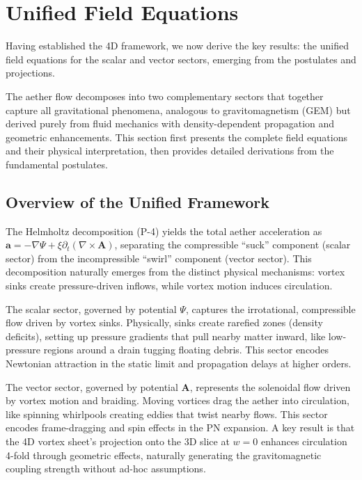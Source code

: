\section{Unified Field Equations}

Having established the 4D framework, we now derive the key results: the unified field equations for the scalar and vector sectors, emerging from the postulates and projections.

The aether flow decomposes into two complementary sectors that together capture all gravitational phenomena, analogous to gravitomagnetism (GEM) but derived purely from fluid mechanics with density-dependent propagation and geometric enhancements. This section first presents the complete field equations and their physical interpretation, then provides detailed derivations from the fundamental postulates.

\subsection{Overview of the Unified Framework}

The Helmholtz decomposition (P-4) yields the total aether acceleration as $\mathbf{a} = -\nabla \Psi + \xi \partial_t (\nabla \times \mathbf{A})$, separating the compressible ``suck'' component (scalar sector) from the incompressible ``swirl'' component (vector sector). This decomposition naturally emerges from the distinct physical mechanisms: vortex sinks create pressure-driven inflows, while vortex motion induces circulation.

The scalar sector, governed by potential $\Psi$, captures the irrotational, compressible flow driven by vortex sinks. Physically, sinks create rarefied zones (density deficits), setting up pressure gradients that pull nearby matter inward, like low-pressure regions around a drain tugging floating debris. This sector encodes Newtonian attraction in the static limit and propagation delays at higher orders.

The vector sector, governed by potential $\mathbf{A}$, represents the solenoidal flow driven by vortex motion and braiding. Moving vortices drag the aether into circulation, like spinning whirlpools creating eddies that twist nearby flows. This sector encodes frame-dragging and spin effects in the PN expansion. A key result is that the 4D vortex sheet's projection onto the 3D slice at $w=0$ enhances circulation 4-fold through geometric effects, naturally generating the gravitomagnetic coupling strength without ad-hoc assumptions.

